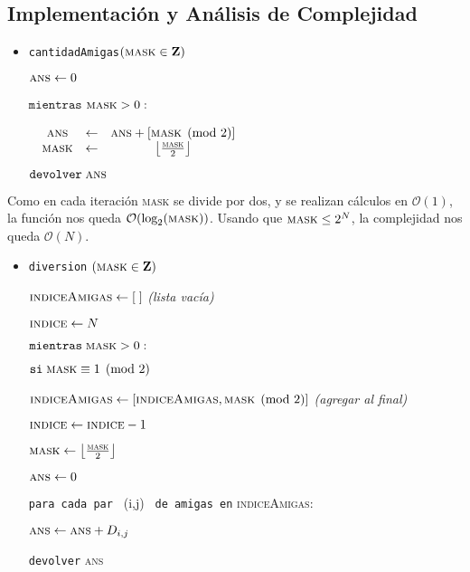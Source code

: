 \subsection*{Implementación y Análisis de Complejidad}
\begin{itemize}
	\item \texttt{cantidadAmigas}$(\textsc{mask} \in \mathbf{Z})$
	
	$\textsc{ans} \leftarrow 0$
	
	$\texttt{mientras}$ $\textsc{mask} > 0:$

	$\begin{matrix}
	& \textsc{ans} & \leftarrow  & \textsc{ans} + \left [ \textsc{mask} \pmod{2}\right ] \\ 
	& \textsc{mask} & \leftarrow  & \left \lfloor \frac{\textsc{mask}}{2} \right \rfloor 
	\end{matrix}$
	
	$\texttt{devolver} \; \textsc{ans}$
\end{itemize}	
	Como en cada iteración \textsc{mask} se divide por dos, y se realizan cálculos en $\mathcal{O}(1)$, la función nos queda $\mathcal{O}(\text{log}_2(\textsc{mask}))$. Usando que $ \textsc{mask} \leq 2^N $, la complejidad nos queda $\mathcal{O}(N)$.
\begin{itemize}
	
	\item \texttt{diversion} $ (\textsc{mask} \in \mathbf{Z}) $
	
	$\textsc{indiceAmigas} \leftarrow [ \; ]$ \textit{(lista vacía)}
	
	$\textsc{indice} \leftarrow N$ 
	
	$\texttt{mientras} \; \textsc{mask} > 0:$
	
	\quad $ \texttt{si} \; \textsc{mask} \equiv 1 \pmod{2}$ 
	
	\quad \quad $ \textsc{indiceAmigas} \leftarrow [\textsc{indiceAmigas}, \textsc{mask} \pmod{2} ] $ \textit{(agregar al final)}
	
	\quad $\textsc{indice} \leftarrow \textsc{indice} - 1$
	
	\quad $\textsc{mask} \leftarrow \left \lfloor \frac{\textsc{mask}}{2} \right \rfloor$ 
	
	$\textsc{ans} \leftarrow 0$
	
	\texttt{para cada par } (i,j) \texttt{ de amigas en} \textsc{indiceAmigas}:
	
	\quad $\textsc{ans} \leftarrow \textsc{ans} + D_{i,j}$
	
	\texttt{devolver} \textsc{ans}

\end{itemize}

